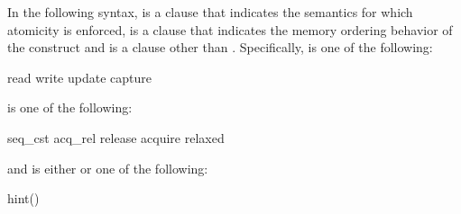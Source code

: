 \syntax
In the following syntax,  is a clause that indicates
the semantics for which atomicity is enforced,  is
a clause that indicates the memory ordering behavior of the construct and
 is a clause other than .
Specifically,  is one of the following:

\begin{indentedcodelist}
read
write
update
capture
\end{indentedcodelist}

 is one of the following:

\begin{indentedcodelist}
seq_cst
acq_rel
release
acquire
relaxed
\end{indentedcodelist}

and  is either  or one of the following:

\begin{indentedcodelist}
hint()
\end{indentedcodelist}

